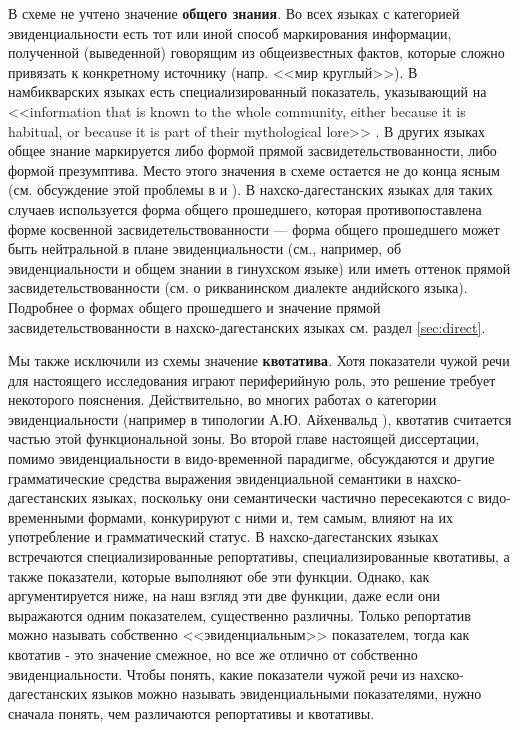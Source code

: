 В схеме не учтено значение \textbf{общего знания}. Во всех языках с категорией эвиденциальности есть тот или иной способ маркирования информации, полученной (выведенной) говорящим из общеизвестных фактов, которые сложно привязать к конкретному источнику (напр. <<мир круглый>>). В намбикварских языках есть специализированный показатель, указывающий на <<information that is known to the whole community, either because it is habitual, or because it is part of their mythological lore>> \citep[350]{eberhard2018}. В других языках общее знание маркируется либо формой прямой засвидетельствованности, либо формой презумптива. 
Место этого значения в схеме остается не до конца ясным (см. обсуждение этой проблемы в \citep[35--38]{plungian2010} и \citep{verhees2019ev}). В нахско-дагестанских языках для таких случаев используется форма общего прошедшего, которая противопоставлена форме косвенной засвидетельствованности --- форма общего прошедшего может быть нейтральной в плане эвиденциальности (см., например, \citep[56]{forker2014} об эвиденциальности и общем знании в гинухском языке) или иметь оттенок прямой засвидетельствованности (см. \citep[274]{verhees2018} о рикванинском диалекте андийского языка). Подробнее о формах общего прошедшего и значение прямой засвидетельствованности в нахско-дагестанских языках см. раздел \ref{sec:direct}.
\par Мы также исключили из схемы значение \textbf{квотатива}. Хотя показатели чужой речи для настоящего исследования играют периферийную роль, это решение требует некоторого пояснения. Действительно, во многих работах о категории эвиденциальности (например в типологии А.Ю. Айхенвальд \citep{aikhenvald2004}), квотатив считается частью этой функциональной зоны. Во второй главе настоящей диссертации, помимо эвиденциальности в видо-временной парадигме, обсуждаются и другие грамматические средства выражения эвиденциальной семантики в нахско-дагестанских языках, поскольку они семантически частично пересекаются с видо-временными формами, конкурируют с ними и, тем самым, влияют на их употребление и грамматический статус. В нахско-дагестанских языках встречаются специализированные репортативы, специализированные квотативы, а также показатели, которые выполняют обе эти функции. Однако, как аргументируется ниже, на наш взгляд эти две функции, даже если они выражаются одним показателем, существенно различны. Только репортатив можно называть собственно <<эвиденциальным>> показателем, тогда как квотатив - это значение смежное, но все же отлично от собственно эвиденциальности. Чтобы понять, какие показатели чужой речи из нахско-дагестанских языков можно называть эвиденциальными показателями, нужно сначала понять, чем различаются репортативы и квотативы. 
